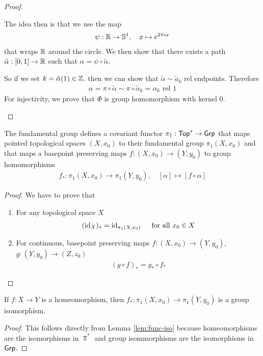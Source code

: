 \begin{proof}
\begin{enumerate}
    The idea then is that we use the map 
    \begin{align*}
      \psi: \mathbb{R} \to \mathbb{S}^{1}, \quad x \mapsto e^{2 \pi i x}
    \end{align*}
    that wraps $\mathbb{R}$ around the circle.
    We then show that there exists a path $\tilde{\alpha}: [0,1] \to  \mathbb{R}$ such that $\alpha = \psi \circ \tilde{\alpha}$.

    So if we set $k = \tilde{\alpha}(1) \in \mathbb{Z}$. then we can show that $\tilde{\alpha} \sim \tilde{a}_k$ rel endpoints.
    Therefore
    \begin{align*}
      \alpha = \pi \circ \tilde{\alpha} \sim \pi \circ \tilde{\alpha}_k = \alpha_k \text{ rel 1}
    \end{align*}
    For injectivity, we prove that $\Phi$ is group homomorphism with kernel $0$.
\end{enumerate}
\end{proof}


\begin{lem}[]
  The fundamental group defines a covariant functor $\pi_1: \text{\sffamily Top}^{\ast} \to \text{\sffamily Grp}$ that maps pointed topological spaces $(X,x_0)$ to their fundamental group $\pi_1(X,x_0)$ and that maps a basepoint preserving maps $f: (X,x_0) \to (Y,y_0)$ to group homomorphisms
\begin{align*}
  f_{\ast}: \pi_1(X,x_0) \to \pi_1(Y,y_0)
  , \quad
  [\alpha] \mapsto [f \circ \alpha]
\end{align*}
\end{lem}
\begin{proof}
We have to prove that 
\begin{enumerate}
  \item For any topological space $X$
    \begin{align*}
      (\operatorname{id}_X)_{\ast} = \operatorname{id}_{\pi_1(X,x_0)} \quad \text{ for all } x_0 \in X
    \end{align*}
  \item For continuous, basepoint preserving maps $f: (X,x_0) \to (Y,y_0)$, $g:(Y,y_0) \to (Z,z_0)$
    \begin{align*}
      (g \circ f)_{\ast} = g_{\ast} \circ f_{\ast}
    \end{align*}
\end{enumerate}
\end{proof}

\begin{cor}[]
  If $f: X \to  Y$ is a homeomorphism, then $f_{\ast}: \pi_1(X,x_0) \to  \pi_1(Y,y_0)$ is a group isomorphism.
\end{cor}
\begin{proof}
  This follows directly from Lemma \ref{lem:func-iso} because homeomorphisms are the isomorphisms in $\Top^{\ast}$ and group isommorphisms are the isomorphisms in $\text{\sffamily Grp}$.
\end{proof}


